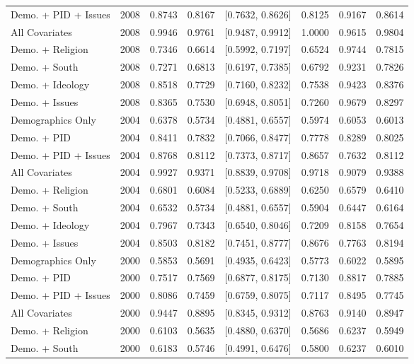 \begin{longtable}{lrrrlrrr}
  Demo. + PID + Issues & 2008 & 0.8743 & 0.8167 & [0.7632, 0.8626] & 0.8125 & 0.9167 & 0.8614 \\ 
  All Covariates & 2008 & 0.9946 & 0.9761 & [0.9487, 0.9912] & 1.0000 & 0.9615 & 0.9804 \\ 
  Demo. + Religion & 2008 & 0.7346 & 0.6614 & [0.5992, 0.7197] & 0.6524 & 0.9744 & 0.7815 \\ 
  Demo. + South & 2008 & 0.7271 & 0.6813 & [0.6197, 0.7385] & 0.6792 & 0.9231 & 0.7826 \\ 
  Demo. + Ideology & 2008 & 0.8518 & 0.7729 & [0.7160, 0.8232] & 0.7538 & 0.9423 & 0.8376 \\ 
  Demo. + Issues & 2008 & 0.8365 & 0.7530 & [0.6948, 0.8051] & 0.7260 & 0.9679 & 0.8297 \\ 
  Demographics Only & 2004 & 0.6378 & 0.5734 & [0.4881, 0.6557] & 0.5974 & 0.6053 & 0.6013 \\ 
  Demo. + PID & 2004 & 0.8411 & 0.7832 & [0.7066, 0.8477] & 0.7778 & 0.8289 & 0.8025 \\ 
  Demo. + PID + Issues & 2004 & 0.8768 & 0.8112 & [0.7373, 0.8717] & 0.8657 & 0.7632 & 0.8112 \\ 
  All Covariates & 2004 & 0.9927 & 0.9371 & [0.8839, 0.9708] & 0.9718 & 0.9079 & 0.9388 \\ 
  Demo. + Religion & 2004 & 0.6801 & 0.6084 & [0.5233, 0.6889] & 0.6250 & 0.6579 & 0.6410 \\ 
  Demo. + South & 2004 & 0.6532 & 0.5734 & [0.4881, 0.6557] & 0.5904 & 0.6447 & 0.6164 \\ 
  Demo. + Ideology & 2004 & 0.7967 & 0.7343 & [0.6540, 0.8046] & 0.7209 & 0.8158 & 0.7654 \\ 
  Demo. + Issues & 2004 & 0.8503 & 0.8182 & [0.7451, 0.8777] & 0.8676 & 0.7763 & 0.8194 \\ 
  Demographics Only & 2000 & 0.5853 & 0.5691 & [0.4935, 0.6423] & 0.5773 & 0.6022 & 0.5895 \\ 
  Demo. + PID & 2000 & 0.7517 & 0.7569 & [0.6877, 0.8175] & 0.7130 & 0.8817 & 0.7885 \\ 
  Demo. + PID + Issues & 2000 & 0.8086 & 0.7459 & [0.6759, 0.8075] & 0.7117 & 0.8495 & 0.7745 \\ 
  All Covariates & 2000 & 0.9447 & 0.8895 & [0.8345, 0.9312] & 0.8763 & 0.9140 & 0.8947 \\ 
  Demo. + Religion & 2000 & 0.6103 & 0.5635 & [0.4880, 0.6370] & 0.5686 & 0.6237 & 0.5949 \\ 
  Demo. + South & 2000 & 0.6183 & 0.5746 & [0.4991, 0.6476] & 0.5800 & 0.6237 & 0.6010 \\ 

\end{longtable}
